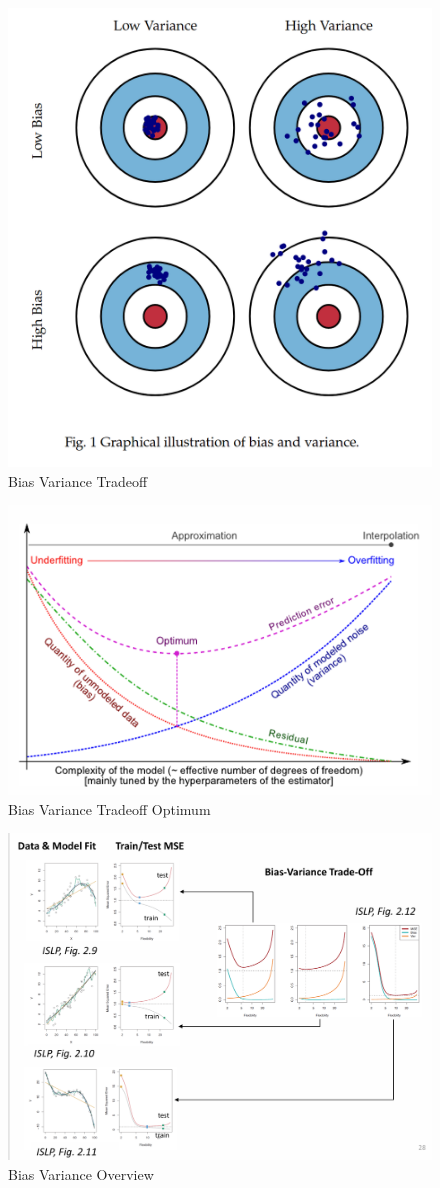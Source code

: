 \documentclass[../Main.tex]{subfiles}
\begin{document}
\begin{figure}[H]
    \centering
    \includegraphics[width=0.5\linewidth]{Images/bias-variance-tradeoff.png}
    \caption{Bias Variance Tradeoff}
\end{figure}
\begin{figure}[H]
    \centering
    \includegraphics[width=0.5\linewidth]{Images/bias-variance-optimum.png}
    \caption{Bias Variance Tradeoff Optimum}
\end{figure}

\begin{figure}[H]
    \centering
    \includegraphics[width=1\linewidth]{Images/bias-variance-tradeoff-overview.png}
    \caption{Bias Variance Overview}
\end{figure}
\end{document}
